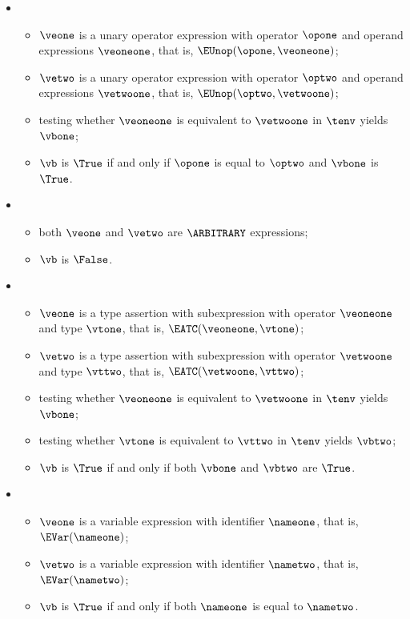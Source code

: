 \begin{itemize}
  \item {}
  \begin{itemize}
    \item $\veone$ is a unary operator expression with operator $\opone$ and operand expressions $\veoneone$,
          that is, $\EUnop(\opone, \veoneone)$;
    \item $\vetwo$ is a unary operator expression with operator $\optwo$ and operand expressions $\vetwoone$,
          that is, $\EUnop(\optwo, \vetwoone)$;
    \item testing whether $\veoneone$ is equivalent to $\vetwoone$ in $\tenv$ yields $\vbone$;
    \item $\vb$ is $\True$ if and only if $\opone$ is equal to $\optwo$ and $\vbone$ is $\True$.
  \end{itemize}

  \item {}
  \begin{itemize}
    \item both $\veone$ and $\vetwo$ are $\ARBITRARY$ expressions;
    \item $\vb$ is $\False$.
  \end{itemize}

  \item {}
  \begin{itemize}
    \item $\veone$ is a type assertion with subexpression with operator $\veoneone$ and type $\vtone$,
          that is, $\EATC(\veoneone, \vtone)$;
    \item $\vetwo$ is a type assertion with subexpression with operator $\vetwoone$ and type $\vttwo$,
          that is, $\EATC(\vetwoone, \vttwo)$;
    \item testing whether $\veoneone$ is equivalent to $\vetwoone$ in $\tenv$ yields $\vbone$;
    \item testing whether $\vtone$ is equivalent to $\vttwo$ in $\tenv$ yields $\vbtwo$;
    \item $\vb$ is $\True$ if and only if both $\vbone$ and $\vbtwo$ are $\True$.
  \end{itemize}

  \item {}
  \begin{itemize}
    \item $\veone$ is a variable expression with identifier $\nameone$, that is, $\EVar(\nameone)$;
    \item $\vetwo$ is a variable expression with identifier $\nametwo$, that is, $\EVar(\nametwo)$;
    \item $\vb$ is $\True$ if and only if both $\nameone$ is equal to $\nametwo$.
  \end{itemize}
\end{itemize}

